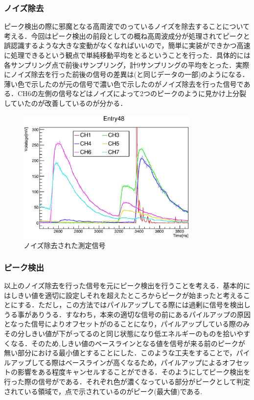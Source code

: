 \subsubsection{ノイズ除去}
ピーク検出の際に邪魔となる高周波でのっているノイズを除去することについて考える．今回はピーク検出の前段としての概ね高周波成分が処理されてピークと誤認識するような大きな変動がなくなればいいので，簡単に実装ができかつ高速に処理できるという観点で単純移動平均をとるということを行った．具体的には各サンプリング点で前後4サンプリング，計9サンプリングの平均をとった．実際にノイズ除去を行った前後の信号の差異は(と同じデータの一部)のようになる．薄い色で示したのが元の信号で濃い色で示したのがノイズ除去を行った信号である．CH6の左側の信号などはノイズによって2つのピークのように見かけ上分裂していたのが改善しているのが分かる．

\begin{figure}[bht]
  \centering
  \includegraphics[width=0.8\textwidth]{figure/hatano/smoothdata.eps}
  \caption{ノイズ除去された測定信号}
  \label{hatano_fig:smoothdata}
\end{figure}

\subsubsection{ピーク検出}
以上のノイズ除去を行った信号を元にピーク検出を行うことを考える．基本的にはしきい値を適切に設定しそれを超えたところからピークが始まったと考えることにする．ただし，この方法ではパイルアップしてる際には過剰に信号を検出しうる事がありうる．すなわち，本来の適切な信号の前にあるパイルアップの原因となった信号によりオフセットがのることになり，パイルアップしている際のみその分しきい値が下がってるのと同じ状態になり低エネルギーのものを拾いやすくなる．そのため,しきい値のベースラインとなる値を信号が来る前のピークが無い部分における最小値とすることにした．このような工夫をすることで，パイルアップしてる際はベースラインが高くなるため，パイルアップによるオフセットの影響をある程度キャンセルすることができる．そのようにしてピーク検出を行った際の信号がである．それぞれ色が濃くなっている部分がピークとして判定されている領域で，点で示されているのがピーク(最大値)である.

